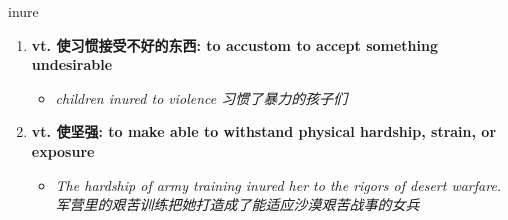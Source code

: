 
\begin{frame}
{\huge inure}
\begin{center}
\begin{enumerate}\Large
  \item \textbf{vt. 使习惯接受不好的东西: to accustom to accept something undesirable}
  \begin{itemize}
    \item \em{\Large{children inured to violence 习惯了暴力的孩子们}}
  \end{itemize}
  \item \textbf{vt. 使坚强: to make able to withstand physical hardship, strain, or exposure}
  \begin{itemize}
    \item \em{\Large{The hardship of army training inured her to the rigors of desert warfare. 军营里的艰苦训练把她打造成了能适应沙漠艰苦战事的女兵}}
  \end{itemize}
\end{enumerate}
\end{center}
\end{frame}
